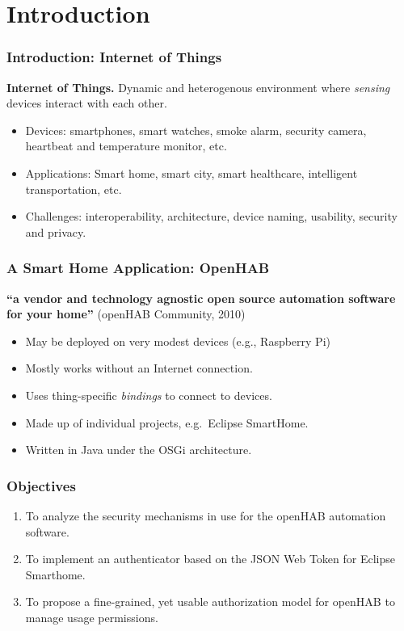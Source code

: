\documentclass{beamer}
\begin{document}
\section{Introduction} %
\begin{frame}
\frametitle{Introduction: Internet of Things}
\textbf{Internet of Things.} Dynamic and heterogenous environment where \emph{sensing} devices interact with each other. 
\begin{itemize}
\setlength\itemsep{1.5em}
\item Devices: smartphones, smart watches, smoke alarm, security camera, heartbeat and temperature monitor, etc.
\item Applications: Smart home, smart city, smart healthcare, intelligent transportation, etc.
\item Challenges: interoperability, architecture, device naming, usability, security and privacy.  
\end{itemize}
\end{frame}
\begin{frame}
\frametitle{A Smart Home Application: OpenHAB}
\textbf{``a vendor and technology agnostic open source automation software for your home''} (openHAB Community, 2010)
\begin{itemize}
  \setlength\itemsep{1.5em}
\item May be deployed on very modest devices (e.g., Raspberry Pi)
\item Mostly works without an Internet connection.
\item Uses thing-specific \emph{bindings} to connect to devices.
\item Made up of individual projects, e.g.\ Eclipse SmartHome.
\item Written in Java under the OSGi architecture. 
\end{itemize}
\end{frame}
\begin{frame}
\frametitle{Objectives} %
\begin{enumerate}
  \setlength\itemsep{1.5em}
\item To analyze the security mechanisms in use for the openHAB automation software.
\item To implement an authenticator based on the JSON Web Token for Eclipse Smarthome.
\item To propose a fine-grained, yet usable authorization model for openHAB to manage usage permissions.
\end{enumerate}
\end{frame}
\end{document}
